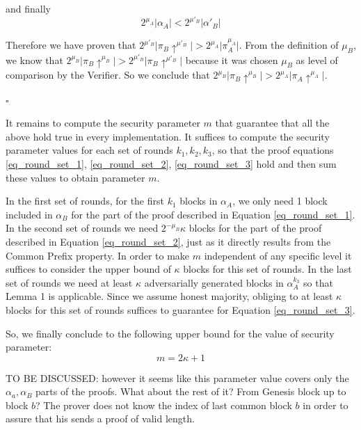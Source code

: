 \documentclass[9pt,a4paper]{article}
\begin{document}
and finally 
\begin{equation}
2^{\mu_A} \vert \alpha_A \vert < 2^{\mu'_B} \vert \alpha'{_B} \vert
\end{equation}


Therefore we have proven that $2^{\mu'_B} \vert \pi_B \uparrow^{\mu'_B} \vert > 2^{\mu_A} \vert \pi_A^{\mu_A} \vert$. From the definition of $\mu_B$, we know that $2^{\mu_B} \vert \pi_B \uparrow^{\mu_B} \vert > 2^{\mu'_B} \vert \pi_B \uparrow^{\mu'_B} \vert$ because it was chosen $\mu_B$ as level of comparison by the Verifier. So we conclude that $2^{\mu_B} \vert \pi_B \uparrow^{\mu_B} \vert > 2^{\mu_A} \vert \pi_A \uparrow^{\mu_A} \vert$.

\begin{flushright}
$\square$
\end{flushright}

It remains to compute the security parameter $m$ that guarantee that all the above hold true in every implementation. It suffices to compute the security parameter values for each set of rounds $k_1, k_2, k_3$, so that the proof equations \ref{eq_round_set_1}, \ref{eq_round_set_2}, \ref{eq_round_set_3} hold and then sum these values to obtain parameter $m$.

In the first set of rounds, for the first $k_1$ blocks in $\alpha_A$, we only need 1 block included in $\alpha_B$ for the part of the proof described in Equation \ref{eq_round_set_1}. In the second set of rounds we need $2^{-\mu_B}\kappa$ blocks for the part of the proof described in Equation \ref{eq_round_set_2}, just as it directly results from the Common Prefix property. In order to make $m$ independent of any specific level it suffices to consider the upper bound of $\kappa$ blocks for this set of rounds. In the last set of rounds we need at least $\kappa$ adversarially generated blocks in $\alpha_A^{k_3}$ so that Lemma 1 is applicable. Since we assume honest majority, obliging to at least $\kappa$ blocks for this set of rounds suffices to guarantee for Equation \ref{eq_round_set_3}.

So, we finally conclude to the following upper bound for the value of security parameter:
\begin{equation}
m = 2\kappa + 1 
\end{equation}
 
{\large TO BE DISCUSSED: however it seems like this parameter value covers only the $\alpha_a, \alpha_B$ parts of the proofs. What about the rest of it? From Genesis block up to block $b$? The prover does not know the index of last common block $b$ in order to assure that his sends a proof of valid length. }
 
\end{document}
